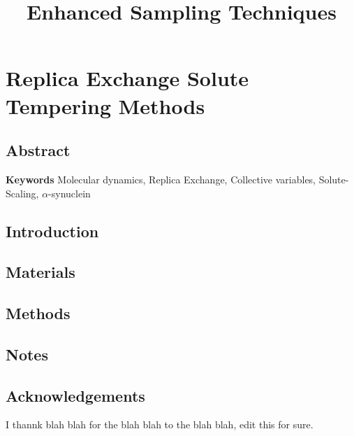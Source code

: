 \documentclass{memoir}
\title{Enhanced Sampling Techniques}
\begin{document}
\date{}

\maketitle

\tableofcontents

\chapter{Replica Exchange Solute Tempering Methods}

\section{Abstract}


\textbf{Keywords} Molecular dynamics, Replica Exchange, Collective variables, Solute-Scaling, $\alpha$-synuclein

\section{Introduction}

    





\section{Materials}



\section{Methods}





\section{Notes}






\section{Acknowledgements}
I thannk blah blah for the blah blah to the blah blah, edit this for sure.



\printbibliography[title={References}]
\end{document}
